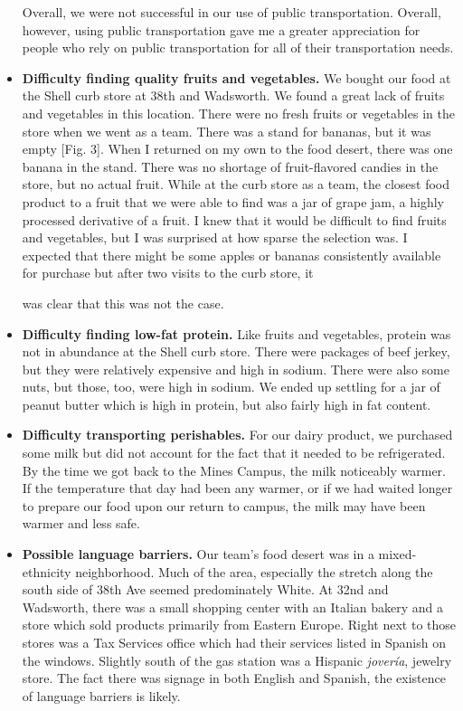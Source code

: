 \documentclass[11pt]{article}
\begin{document}
\begin{itemize}
        Overall, we were not successful in our use of public transportation. Overall, however, using
        public transportation gave me a greater appreciation for people who rely on public
        transportation for all of their transportation needs.

    \item \textbf{Difficulty finding quality fruits and vegetables.} We bought our food at the
        Shell curb store at 38th and Wadsworth. We found a great lack of fruits and vegetables in
        this location. There were no fresh fruits or vegetables in the store when we went as a team.
        There was a stand for bananas, but it was empty [Fig. 3]. When I returned on my own to the
        food desert, there was one banana in the stand. There was no shortage of fruit-flavored
        candies in the store, but no actual fruit. While at the curb store as a team, the closest
        food product to a fruit that we were able to find was a jar of grape jam, a highly processed
        derivative of a fruit. I knew that it would be difficult to find fruits and vegetables, but
        I was surprised at how sparse the selection was. I expected that there might be some apples
        or bananas consistently available for purchase but after two visits to the curb store, it

        was clear that this was not the case.

    \item \textbf{Difficulty finding low-fat protein.} Like fruits and vegetables, protein was not
        in abundance at the Shell curb store. There were packages of beef jerkey, but they were
        relatively expensive and high in sodium. There were also some nuts, but those, too, were
        high in sodium. We ended up settling for a jar of peanut butter which is high in protein,
        but also fairly high in fat content.

    \item \textbf{Difficulty transporting perishables.} For our dairy product, we purchased some
        milk but did not account for the fact that it needed to be refrigerated. By the time we got
        back to the Mines Campus, the milk noticeably warmer. If the temperature that day had been
        any warmer, or if we had waited longer to prepare our food upon our return to campus, the
        milk may have been warmer and less safe.

    \item \textbf{Possible language barriers.} Our team's food desert was in a mixed-ethnicity
        neighborhood. Much of the area, especially the stretch along the south side of 38th Ave
        seemed predominately White. At 32nd and Wadsworth, there was a small shopping center with an
        Italian bakery and a store which sold products primarily from Eastern Europe. Right next to
        those stores was a Tax Services office which had their services listed in Spanish on the
        windows. Slightly south of the gas station was a Hispanic \textit{jover\'{i}a}, jewelry
        store. The fact there was signage in both English and Spanish, the existence of language
        barriers is likely.
\end{itemize}
\end{document}
